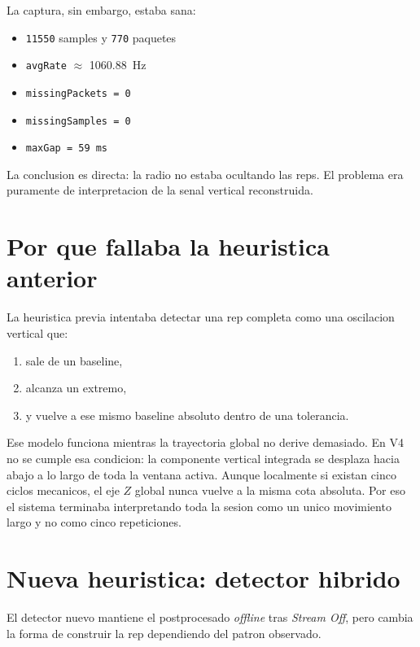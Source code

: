 ﻿\documentclass[11pt,a4paper]{article}
\begin{document}
La captura, sin embargo, estaba sana:
\begin{itemize}[leftmargin=14pt]
  \item \texttt{11550} samples y \texttt{770} paquetes
  \item \texttt{avgRate} $\approx$ \SI{1060,88}{Hz}
  \item \texttt{missingPackets = 0}
  \item \texttt{missingSamples = 0}
  \item \texttt{maxGap = 59 ms}
\end{itemize}

La conclusion es directa: la radio no estaba ocultando las reps. El problema era puramente de interpretacion de la senal vertical reconstruida.

\section{Por que fallaba la heuristica anterior}
La heuristica previa intentaba detectar una rep completa como una oscilacion vertical que:
\begin{enumerate}[leftmargin=16pt]
  \item sale de un baseline,
  \item alcanza un extremo,
  \item y vuelve a ese mismo baseline absoluto dentro de una tolerancia.
\end{enumerate}

Ese modelo funciona mientras la trayectoria global no derive demasiado. En V4 no se cumple esa condicion: la componente vertical integrada se desplaza hacia abajo a lo largo de toda la ventana activa. Aunque localmente si existan cinco ciclos mecanicos, el eje \(Z\) global nunca vuelve a la misma cota absoluta. Por eso el sistema terminaba interpretando toda la sesion como un unico movimiento largo y no como cinco repeticiones.

\section{Nueva heuristica: detector hibrido}
El detector nuevo mantiene el postprocesado \emph{offline} tras \emph{Stream Off}, pero cambia la forma de construir la rep dependiendo del patron observado.
\end{document}
